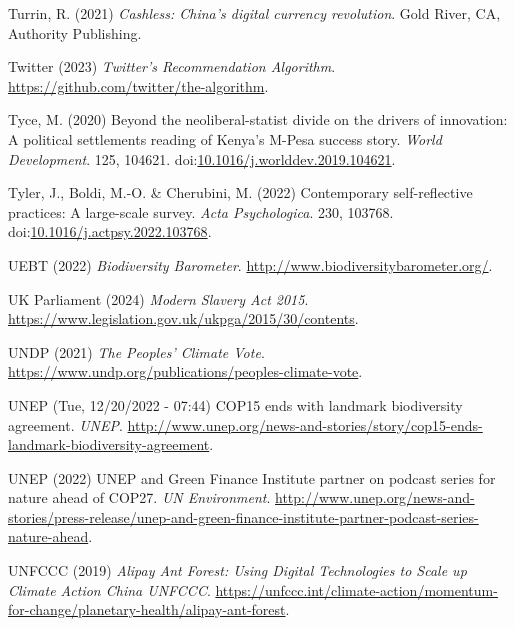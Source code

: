 \documentclass[
  letterpaper,
  DIV=11,
  numbers=noendperiod]{scrartcl}
\newlength{\cslhangindent}
\newenvironment{CSLReferences}[2] %
 {\begin{list}{}{%
  \setlength{\itemindent}{0pt}
  \setlength{\leftmargin}{0pt}
  \setlength{\parsep}{0pt}
  \ifodd #1
   \setlength{\leftmargin}{\cslhangindent}
   \setlength{\itemindent}{-1\cslhangindent}
  \fi
  \setlength{\itemsep}{#2\baselineskip}}}
 {\end{list}}
\begin{document}
\begin{CSLReferences}{0}{1}
Turrin, R. (2021) \emph{Cashless: {China}'s digital currency
revolution}. Gold River, CA, Authority Publishing.

Twitter (2023) \emph{Twitter's {Recommendation Algorithm}}.
\url{https://github.com/twitter/the-algorithm}.

Tyce, M. (2020) Beyond the neoliberal-statist divide on the drivers of
innovation: {A} political settlements reading of {Kenya}'s {M-Pesa}
success story. \emph{World Development}. 125, 104621.
doi:\href{https://doi.org/10.1016/j.worlddev.2019.104621}{10.1016/j.worlddev.2019.104621}.

Tyler, J., Boldi, M.-O. \& Cherubini, M. (2022) Contemporary
self-reflective practices: {A} large-scale survey. \emph{Acta
Psychologica}. 230, 103768.
doi:\href{https://doi.org/10.1016/j.actpsy.2022.103768}{10.1016/j.actpsy.2022.103768}.

UEBT (2022) \emph{Biodiversity {Barometer}}.
\url{http://www.biodiversitybarometer.org/}.

UK Parliament (2024) \emph{Modern {Slavery Act} 2015}.
\url{https://www.legislation.gov.uk/ukpga/2015/30/contents}.

UNDP (2021) \emph{The {Peoples}' {Climate Vote}}.
\url{https://www.undp.org/publications/peoples-climate-vote}.

UNEP (Tue, 12/20/2022 - 07:44) {COP15} ends with landmark biodiversity
agreement. \emph{UNEP}.
\url{http://www.unep.org/news-and-stories/story/cop15-ends-landmark-biodiversity-agreement}.

UNEP (2022) {UNEP} and {Green Finance Institute} partner on podcast
series for nature ahead of {COP27}. \emph{UN Environment}.
\url{http://www.unep.org/news-and-stories/press-release/unep-and-green-finance-institute-partner-podcast-series-nature-ahead}.

UNFCCC (2019) \emph{Alipay {Ant Forest}: {Using Digital Technologies} to
{Scale} up {Climate Action} {\textbar} {China} {\textbar} {UNFCCC}}.
\url{https://unfccc.int/climate-action/momentum-for-change/planetary-health/alipay-ant-forest}.


\end{CSLReferences}
\end{document}
